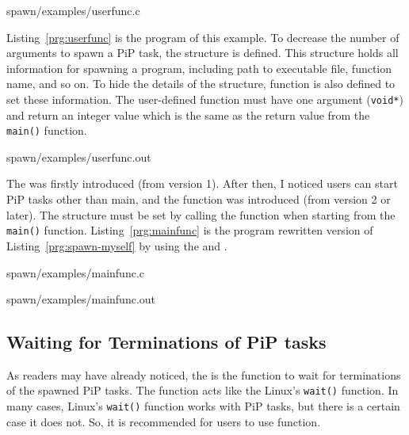  {spawn/examples/userfunc.c}

Listing~\ref{prg:userfunc} is the program of this example. To decrease
the number of arguments to spawn a PiP task, the
 structure is defined. This structure
holds all information for spawning a program, including path to
executable file, function name, and so on. To hide the details of the
structure,  function is also defined
to set these information. The user-defined function must have one
argument ({\tt void*}) and return an integer value which is the same
as the return value from the {\tt main()} function.

 {spawn/examples/userfunc.out}

The  was firstly introduced (from version
1). After then, I noticed users can start PiP tasks other than main,
and the  function was
introduced (from version 2 or later). The
 structure must be set 
by calling the  function when
starting from the {\tt main()} function. Listing~\ref{prg:mainfunc} is
the program rewritten version of Listing~\ref{prg:spawn-myself} by
using the  and
.


                {spawn/examples/mainfunc.c}

 {spawn/examples/mainfunc.out}


\subsection{Waiting for Terminations of PiP tasks}

As readers may have already noticed, the  is the
function to wait for terminations of the spawned PiP tasks. The
 function acts like the Linux's {\tt wait()}
function. In many cases, Linux's {\tt wait()} function works with PiP
tasks, but there is a certain case it does not. So, it is recommended
for users to use  function.

